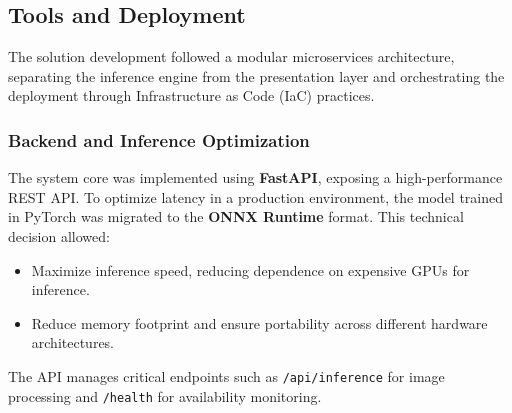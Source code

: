 \subsection{Tools and Deployment}

The solution development followed a modular microservices architecture, separating the inference engine from the presentation layer and orchestrating the deployment through Infrastructure as Code (IaC) practices.

\subsubsection{Backend and Inference Optimization}

The system core was implemented using \textbf{FastAPI}, exposing a high-performance REST API. To optimize latency in a production environment, the model trained in PyTorch was migrated to the \textbf{ONNX Runtime} format. This technical decision allowed:
\begin{itemize}
    \item Maximize inference speed, reducing dependence on expensive GPUs for inference.
    \item Reduce memory footprint and ensure portability across different hardware architectures.
\end{itemize}
The API manages critical endpoints such as \texttt{/api/inference} for image processing and \texttt{/health} for availability monitoring.


